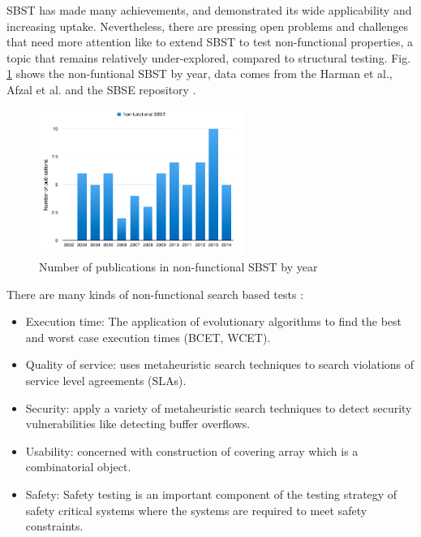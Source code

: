 \documentclass[espaco=umemeio,chapter=TITLE,twoside,openright]{abnt}
\begin{document}
SBST has made many achievements, and demonstrated its wide applicability and increasing uptake. Nevertheless, there are pressing open problems and challenges that need more attention like to extend SBST to test non-functional properties, a topic that remains relatively under-explored, compared to structural testing.  Fig. \ref{fig:nonfunctional} shows the non-funtional SBST by year, data comes from the Harman et al., Afzal et al. and the SBSE repository \cite{Aleti2016} \cite{Harman2015}.


\begin{figure}[h]
\centering
\includegraphics[width=0.6\textwidth]{./images/nonfunctional.png}
\caption{Number of publications in non-functional SBST by year \cite{Afzal2009a} \cite{Harman2015} }
\label{fig:nonfunctional}
\end{figure}



There are many kinds of non-functional search based tests  \cite{Afzal2009a}:

\begin{itemize}
\item Execution time: The application of evolutionary algorithms to find the best and worst case execution times (BCET, WCET).
\item Quality of service: uses metaheuristic search techniques to search violations of service level agreements (SLAs).
\item Security: apply a variety of metaheuristic search techniques  to detect security vulnerabilities like detecting buffer overflows.
\item Usability: concerned with construction of covering array which is a combinatorial object.
\item Safety: Safety testing is an important component of the testing strategy of safety critical systems where the systems are required to meet safety constraints.
\end{itemize}
\end{document}
